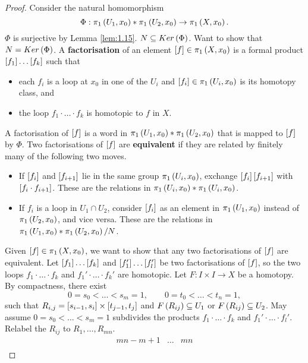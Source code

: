 \begin{proof}
Consider the natural homomorphism
$$ \Phi : \pi_1\rb{U_1, x_0} * \pi_1\rb{U_2, x_0} \to \pi_1\rb{X, x_0}. $$
$ \Phi $ is surjective by Lemma \ref{lem:1.15}. $ N \subseteq Ker\rb{\Phi} $. Want to show that $ N = Ker\rb{\Phi} $. A \textbf{factorisation} of an element $ \sb{f} \in \pi_1\rb{X, x_0} $ is a formal product $ \sb{f_1} \dots \sb{f_k} $ such that
\begin{itemize}
\item each $ f_i $ is a loop at $ x_0 $ in one of the $ U_i $ and $ \sb{f_i} \in \pi_1\rb{U_i, x_0} $ is its homotopy class, and
\item the loop $ f_1 \cdot \dots \cdot f_k $ is homotopic to $ f $ in $ X $.
\end{itemize}
A factorisation of $ \sb{f} $ is a word in $ \pi_1\rb{U_1, x_0} * \pi_1\rb{U_2, x_0} $ that is mapped to $ \sb{f} $ by $ \Phi $. Two factorisations of $ \sb{f} $ are \textbf{equivalent} if they are related by finitely many of the following two moves.
\begin{itemize}
\item If $ \sb{f_i} $ and $ \sb{f_{i + 1}} $ lie in the same group $ \pi_1\rb{U_i, x_0} $, exchange $ \sb{f_i}\sb{f_{i + 1}} $ with $ \sb{f_i \cdot f_{i + 1}} $. These are the relations in $ \pi_1\rb{U_i, x_0} * \pi_1\rb{U_i, x_0} $.
\item If $ f_i $ is a loop in $ U_1 \cap U_2 $, consider $ \sb{f_i} $ as an element in $ \pi_1\rb{U_1, x_0} $ instead of $ \pi_1\rb{U_2, x_0} $, and vice versa. These are the relations in $ \pi_1\rb{U_1, x_0} * \pi_1\rb{U_2, x_0} / N $.
\end{itemize}
Given $ \sb{f} \in \pi_1\rb{X, x_0} $, we want to show that any two factorisations of $ \sb{f} $ are equivalent. Let $ \sb{f_1} \dots \sb{f_k} $ and $ \sb{f_1'} \dots \sb{f_l'} $ be two factorisations of $ \sb{f} $, so the two loops $ f_1 \cdot \dots \cdot f_k $ and $ f_1' \cdot \dots \cdot f_k' $ are homotopic. Let $ F : I \times I \to X $ be a homotopy. By compactness, there exist
$$ 0 = s_0 < \dots < s_m = 1, \qquad 0 = t_0 < \dots < t_n = 1, $$
such that $ R_{i, j} = \sb{s_{i - 1}, s_i} \times \sb{t_{j - 1}, t_j} $ and $ F\rb{R_{ij}} \subseteq U_1 $ or $ F\rb{R_{ij}} \subseteq U_2 $. May assume $ 0 = s_0 < \dots < s_m = 1 $ subdivides the products $ f_1 \cdot \dots \cdot f_k $ and $ f_1' \cdot \dots \cdot f_l' $. Relabel the $ R_{ij} $ to $ R_1, \dots, R_{mn} $.
$$
\begin{array}{|c|c|c|}
\hline
mn - m + 1 & \dots & mn \\

\end{array}$$
\end{proof}
